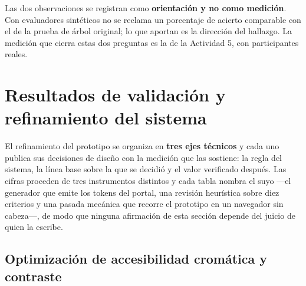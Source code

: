 \begin{uxlist}
\end{uxlist}

Las dos observaciones se registran como \textbf{orientación y no como medición}. Con evaluadores
sintéticos no se reclama un porcentaje de acierto comparable con el de la prueba de árbol original;
lo que aportan es la dirección del hallazgo. La medición que cierra estas dos preguntas es la de la
Actividad 5, con participantes reales.

\section{Resultados de validación y refinamiento del sistema}

El refinamiento del prototipo se organiza en \textbf{tres ejes técnicos} y cada uno publica sus
decisiones de diseño con la medición que las sostiene: la regla del sistema, la línea base sobre la
que se decidió y el valor verificado después. Las cifras proceden de tres instrumentos distintos y
cada tabla nombra el suyo ---el generador que emite los tokens del portal, una revisión heurística
sobre diez criterios y una pasada mecánica que recorre el prototipo en un navegador sin cabeza---,
de modo que ninguna afirmación de esta sección depende del juicio de quien la escribe.

\subsection{Optimización de accesibilidad cromática y contraste}

